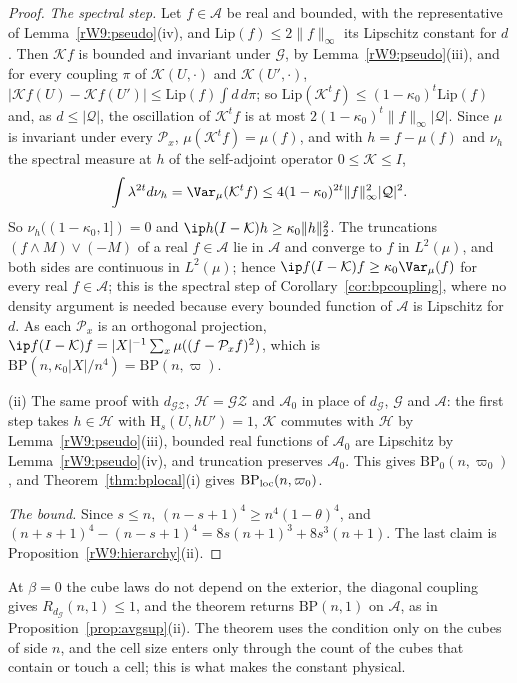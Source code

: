 \begin{proof}
\emph{The spectral step.} Let $f\in\mathcal A$ be real and bounded, with the
representative of Lemma~\ref{rW9:pseudo}(iv), and $\mathrm{Lip}(f)\le2\lVert
f\rVert_\infty$ its Lipschitz constant for $d$. Then $\mathcal Kf$ is bounded
and invariant under $\mathcal G$, by Lemma~\ref{rW9:pseudo}(iii), and for
every coupling $\pi$ of $\mathcal K(U,\cdot)$ and $\mathcal K(U',\cdot)$,
$\lvert\mathcal Kf(U)-\mathcal Kf(U')\rvert\le\mathrm{Lip}(f)\int d\,d\pi$;
so $\mathrm{Lip}(\mathcal K^tf)\le(1-\kappa_0)^t\mathrm{Lip}(f)$ and, as $d\le
\lvert\mathcal Q\rvert$, the oscillation of $\mathcal K^tf$ is at most
$2(1-\kappa_0)^t\lVert f\rVert_\infty\lvert\mathcal Q\rvert$. Since $\mu$ is
invariant under every $\mathcal P_x$, $\mu(\mathcal K^tf)=\mu(f)$, and with
$h=f-\mu(f)$ and $\nu_h$ the spectral measure at $h$ of the self-adjoint
operator $0\le\mathcal K\le I$,
\[
\int\lambda^{2t}d\nu_h=\Var_\mu(\mathcal K^tf)\le4(1-\kappa_0)^{2t}\lVert f
\rVert_\infty^2\lvert\mathcal Q\rvert^2 .
\]
So $\nu_h((1-\kappa_0,1])=0$ and $\ip h{(I-\mathcal K)h}\ge\kappa_0\lVert h
\rVert_2^2$. The truncations $(f\wedge M)\vee(-M)$ of a real $f\in\mathcal A$
lie in $\mathcal A$ and converge to $f$ in $L^2(\mu)$, and both sides are
continuous in $L^2(\mu)$; hence $\ip f{(I-\mathcal K)f}\ge\kappa_0\Var_\mu(f)$
for every real $f\in\mathcal A$; this is the spectral step of
Corollary~\ref{cor:bpcoupling}, where no density argument is needed because
every bounded function of $\mathcal A$ is Lipschitz for $d$. As each
$\mathcal P_x$ is an orthogonal
projection, $\ip f{(I-\mathcal K)f}=\lvert X\rvert^{-1}\sum_x\mu((f-\mathcal
P_xf)^2)$, which is $\mathrm{BP}(n,\kappa_0\lvert X\rvert/n^4)=\mathrm{BP}(n,
\varpi)$.

(ii) The same proof with $d_{\mathcal{GZ}}$, $\mathcal H=\mathcal G\mathcal Z$
and $\mathcal A_0$ in place of $d_{\mathcal G}$, $\mathcal G$ and $\mathcal A$:
the first step takes $h\in\mathcal H$ with $\mathrm H_s(U,hU')=1$, $\mathcal K$
commutes with $\mathcal H$ by Lemma~\ref{rW9:pseudo}(iii), bounded real
functions of $\mathcal A_0$ are Lipschitz by Lemma~\ref{rW9:pseudo}(iv), and
truncation preserves $\mathcal A_0$. This gives $\mathrm{BP}_0(n,\varpi_0)$,
and Theorem~\ref{thm:bplocal}(i) gives $\mathrm{BP}_{\rm loc}(n,\varpi_0)$.

\emph{The bound.} Since $s\le n$, $(n-s+1)^4\ge n^4(1-\theta)^4$, and
$(n+s+1)^4-(n-s+1)^4=8s(n+1)^3+8s^3(n+1)$. The last claim is
Proposition~\ref{rW9:hierarchy}(ii).
\end{proof}

At $\beta=0$ the cube laws do not depend on the exterior, the diagonal
coupling gives $R_{d_{\mathcal G}}(n,1)\le1$, and the theorem returns
$\mathrm{BP}(n,1)$ on $\mathcal A$, as in Proposition~\ref{prop:avgsup}(ii).
The theorem uses the condition only on the cubes of side $n$,
and the cell size enters only through the count of the cubes that contain or
touch a cell; this is what makes the constant physical.

